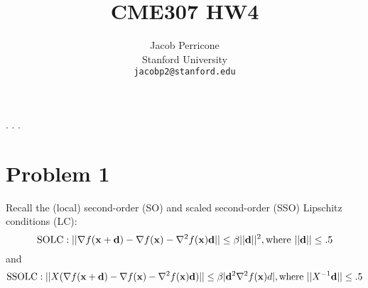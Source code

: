 \documentclass[answers]{exam} %
\title{CME307 HW4}
\author{
Jacob Perricone\\
Stanford University\\
\texttt{jacobp2@stanford.edu} \\
}
\newcommand\x{{\bf x}}
\renewcommand\d{{\bf d}}
\begin{document}
        \newcommand{\pr}{\operatornamewithlimits{(t)}}.
    \newcommand{\prm}{\operatornamewithlimits{(t-1)}}.
    \setlength{\abovedisplayskip}{5pt}
\setlength{\belowdisplayskip}{5pt}
    \newcommand{\argmin}{\operatornamewithlimits{argmin}}.

    \maketitle
    

\section*{Problem 1}
Recall the (local) second-order (SO) and scaled second-order (SSO) Lipschitz conditions (LC):
 \[
 \mbox{SOLC}: || \nabla f(\x+\d)-\nabla f(\x)-\nabla^2 f(\x)\d || \leq \beta||\d||^2, \mbox{where } ||\d|| \leq .5
 \]
 and
 \[
 \mbox{SSOLC}: || X(\nabla f(\x+\d)-\nabla f(\x)-\nabla^2 f(\x)\d)|| \leq \beta | \d^2 \nabla^2 f(\x)d| , \mbox{where } ||X^{-1}\d|| \leq .5
 \]
\end{document}
